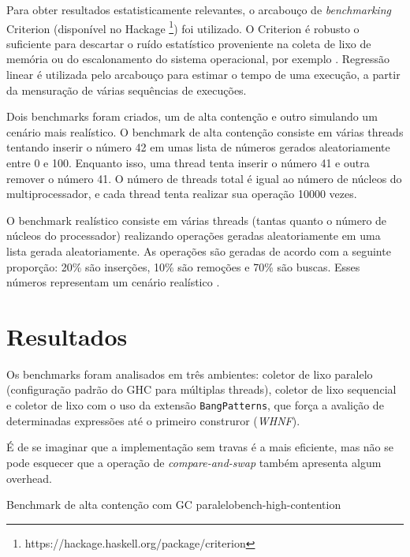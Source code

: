 \documentclass[a4paper,12pt,oldfontcommands]{abntex2}
\begin{document}
Para obter resultados estatisticamente relevantes, o arcabouço de \textit{benchmarking} Criterion (disponível no Hackage \footnote{https://hackage.haskell.org/package/criterion}) foi utilizado. O Criterion é robusto o suficiente para descartar o ruído estatístico proveniente na coleta de lixo de memória ou do escalonamento do sistema operacional, por exemplo \cite{lima2016haskell}. Regressão linear é utilizada pelo arcabouço para estimar o tempo de uma execução, a partir da mensuração de várias sequências de execuções.

Dois benchmarks foram criados, um de alta contenção e outro simulando um cenário mais realístico. O benchmark de alta contenção consiste em várias threads tentando inserir o número 42 em umas lista de números gerados aleatoriamente entre 0 e 100. Enquanto isso, uma thread tenta inserir o número 41 e outra remover o número 41. O número de threads total é igual ao número de núcleos do multiprocessador, e cada thread tenta realizar sua operação 10000 vezes.

O benchmark realístico consiste em várias threads (tantas quanto o número de núcleos do processador) realizando operações geradas aleatoriamente em uma lista gerada aleatoriamente. As operações são geradas de acordo com a seguinte proporção: 20\% são inserções, 10\% são remoções e 70\% são buscas. Esses números representam um cenário realístico \cite{sulzmann2009comparing}.

\section{Resultados}

Os benchmarks foram analisados em três ambientes: coletor de lixo paralelo (configuração padrão do GHC para múltiplas threads), coletor de lixo sequencial e coletor de lixo com o uso da extensão \texttt{BangPatterns}, que força a avalição de determinadas expressões até o primeiro construror (\textit{WHNF}).

É de se imaginar que a implementação sem travas é a mais eficiente, mas não se pode esquecer que a operação de \textit{compare-and-swap} também apresenta algum overhead.

\begin{center}
\begin{graph}{Benchmark de alta contenção com GC paralelo}{bench-high-contention}
\begin{bchart}[step=3,max=16,unit=s,width=.9\textwidth]
        \smallskip
        \smallskip
        \smallskip
        \smallskip
        \smallskip
\end{bchart}
\end{graph}
\end{center}
\end{document}
